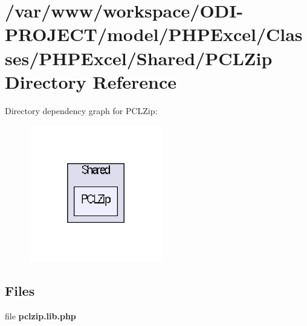 \section{/var/www/workspace/\+O\+D\+I-\/\+P\+R\+O\+J\+E\+C\+T/model/\+P\+H\+P\+Excel/\+Classes/\+P\+H\+P\+Excel/\+Shared/\+P\+C\+L\+Zip Directory Reference}
\label{dir_d8262fb4ed01c894d3f1ca09a3f2e85c}
Directory dependency graph for P\+C\+L\+Zip\+:\nopagebreak
\begin{figure}[H]
\begin{center}
\leavevmode
\includegraphics[width=166pt]{dir_d8262fb4ed01c894d3f1ca09a3f2e85c_dep}
\end{center}
\end{figure}
\subsection*{Files}
\begin{DoxyCompactItemize}
\item 
file {\bfseries pclzip.\+lib.\+php}
\end{DoxyCompactItemize}
